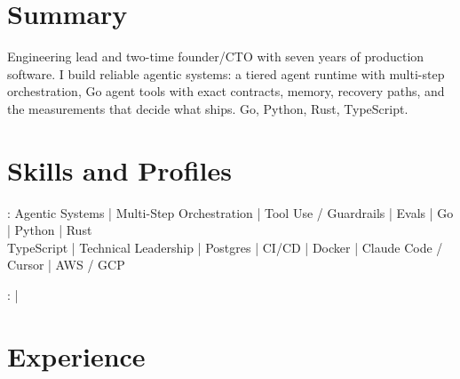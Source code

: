 \documentclass[print]{jack-resume}
\begin{document}
\pagecolor{darkmodeBackground}


\begin{minipage}[t][1cm][t]{.03\textwidth}
    \hfill
\end{minipage}

\section{Summary}
Engineering lead and two-time founder/CTO with seven years of production software. I build reliable agentic systems: a tiered agent runtime with multi-step orchestration, Go agent tools with exact contracts, memory, recovery paths, and the measurements that decide what ships. Go, Python, Rust, TypeScript.
\sectionsep

\section{Skills and Profiles}
:
Agentic Systems \hfill | \hfill
Multi-Step Orchestration \hfill | \hfill
Tool Use / Guardrails \hfill | \hfill
Evals \hfill | \hfill
Go \hfill | \hfill
Python \hfill | \hfill
Rust \\
\hspace{1.0cm} TypeScript \hfill | \hfill
Technical Leadership \hfill | \hfill
Postgres \hfill | \hfill
CI/CD \hfill | \hfill
Docker \hfill | \hfill
Claude Code / Cursor \hfill | \hfill
AWS / GCP \\

\raggedright{
    :
      \href{https://www.linkedin.com/in/jack-sturtevant/}{ \ExternalLink} |
     \href{https://github.com/jacksturt}{ \ExternalLink}}

\section{Experience}
\end{document}
